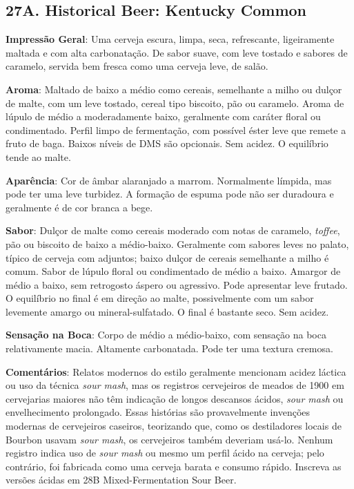\subsection*{27A. Historical Beer: Kentucky Common}
\textbf{Impressão Geral}: Uma cerveja escura, limpa, seca, refrescante, ligeiramente maltada e com alta carbonatação. De sabor suave, com leve tostado e sabores de caramelo, servida bem fresca como uma cerveja leve, de salão.

\textbf{Aroma}: Maltado de baixo a médio como cereais, semelhante a milho ou dulçor de malte, com um leve tostado, cereal tipo biscoito, pão ou caramelo. Aroma de lúpulo de médio a moderadamente baixo, geralmente com caráter floral ou condimentado. Perfil limpo de fermentação, com possível éster leve que remete a fruto de baga. Baixos níveis de DMS são opcionais. Sem acidez. O equilíbrio tende ao malte.

\textbf{Aparência}: Cor de âmbar alaranjado a marrom. Normalmente límpida, mas pode ter uma leve turbidez. A formação de espuma pode não ser duradoura e geralmente é de cor branca a bege.

\textbf{Sabor}: Dulçor de malte como cereais moderado com notas de caramelo, \textit{toffee}, pão ou biscoito de baixo a médio-baixo. Geralmente com sabores leves no palato, típico de cerveja com adjuntos; baixo dulçor de cereais semelhante a milho é comum. Sabor de lúpulo floral ou condimentado de médio a baixo. Amargor de médio a baixo, sem retrogosto áspero ou agressivo. Pode apresentar leve frutado. O equilíbrio no final é em direção ao malte, possivelmente com um sabor levemente amargo ou mineral-sulfatado. O final é bastante seco. Sem acidez.

\textbf{Sensação na Boca}: Corpo de médio a médio-baixo, com sensação na boca relativamente macia. Altamente carbonatada. Pode ter uma textura cremosa.

\textbf{Comentários}: Relatos modernos do estilo geralmente mencionam acidez láctica ou uso da técnica \textit{sour mash}, mas os registros cervejeiros de meados de 1900 em cervejarias maiores não têm indicação de longos descansos ácidos, \textit{sour mash} ou envelhecimento prolongado. Essas histórias são provavelmente invenções modernas de cervejeiros caseiros, teorizando que, como os destiladores locais de Bourbon usavam \textit{sour mash}, os cervejeiros também deveriam usá-lo. Nenhum registro indica uso de \textit{sour mash} ou mesmo um perfil ácido na cerveja; pelo contrário, foi fabricada como uma cerveja barata e consumo rápido. Inscreva as versões ácidas em 28B Mixed-Fermentation Sour Beer.

